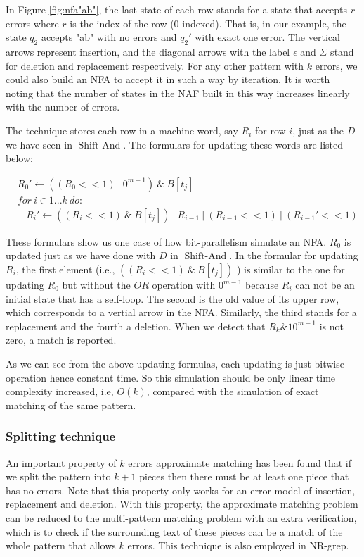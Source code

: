 In Figure \ref{fig:nfa"ab"}, the last state of each row stands for a state that accepts $r$ errors where $r$ is the index of the row (0-indexed). That is, in our example, the state $q_2$ accepts "ab" with no errors and $q_2'$  with exact one error. The vertical arrows represent insertion, and the diagonal arrows with the label $\epsilon$ and $\Sigma$ stand for deletion and replacement respectively. For any other pattern with $k$ errors, we could also build an NFA to accept it in such a way by iteration. It is worth noting that the number of states in the NAF built in this way increases linearly with the number of errors.

The technique stores each row in a machine word, say $R_i$ for row $i$, just as the $D$ we have seen in $\operatorname{Shift-And}$.
The formulars for updating these words are listed below:

\begin{align*}
&R_0' \leftarrow  ((R_0 << 1) \ |\ 0^{m-1}) \ \& \ B[t_j] \\
&for \ i \in 1...k \ do:  \\
&\ \ \ \ R_i' \leftarrow ((R_i << 1) \ \& \ B[t_j] ) \ |\ R_{i-1} \ | \ (R_{i-1} << 1 ) \ |\ (R_{i-1}' << 1)
\end{align*}

These formulars show us one case of how bit-parallelism simulate an NFA. $R_0$ is updated just as we have done with $D$ in $\operatorname{Shift-And}$. In the formular for updating $R_i$, the first element (i.e., $((R_i << 1) \ \& \ B[t_j] ) $ ) is similar to the one for updating $R_0$  but without the $OR$ operation with $0^{m-1}$ because $R_i$ can not be an initial state that has a self-loop. The second is the old value of its upper row, which corresponds to a vertial arrow in the NFA. Similarly, the third stands for a replacement and the fourth a deletion. When we detect that $R_k \& 10^{m-1}$ is not zero, a match is reported.  

As we can see from the above updating formulas, each updating is just bitwise operation hence constant time. So this simulation should be only linear time complexity increased, i.e, $O(k)$, compared with the simulation of exact matching of the same pattern.
 

\subsubsection{Splitting technique}
An important property of $k$ errors approximate matching has been found that if we split the pattern into $k+1$ pieces then there must be at least one piece that has no errors\cite{wu1992}. Note that this property only works for an error model of insertion, replacement and deletion. With this property, the approximate matching problem can be reduced to the multi-pattern matching problem with an extra verification, which is to check if the surrounding text of these pieces can be a match of the whole pattern that allows $k$ errors. This technique is also employed in NR-grep. 
